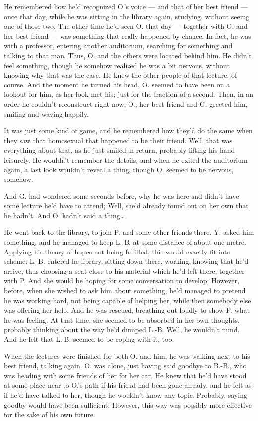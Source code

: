 He remembered how he'd recognized O.'s voice --- and that of her best friend --- once that day, while he was sitting in the library again, studying, without seeing one of those two. 
The other time he'd seen O. that day --- together with G. and her best friend --- was something that really happened by chance. In fact, he was with a professor, entering another auditorium, searching for something and talking to that man. Thus, O. and the others were located behind him. He didn't feel something, though he somehow realized he was a bit nervous, without knowing why that was the case. He knew the other people of that lecture, of course. And the moment he turned his head, O. seemed to have been on a lookout for him, as her look met his; just for the fraction of a second. Then, in an order he couldn't reconstruct right now, O., her best friend and G. greeted him, smiling and waving happily.

It was just some kind of game, and he remembered how they'd do the same when they saw that homosexual that happened to be their friend. 
Well, that was everything about that, as he just smiled in return, probably lifting his hand leisurely. He wouldn't remember the details, and when he exited the auditorium again, a last look wouldn't reveal a thing, though O. seemed to be nervous, somehow.

And G. had wondered some seconds before, why he was here and didn't have some lecture he'd have to attend; Well, she'd already found out on her own that he hadn't. 
And O. hadn't said a thing\dots{}

He went back to the library, to join P. and some other friends there. 
Y. asked him something, and he managed to keep L.-B. at some distance of about one metre. Applying his theory of hopes not being fulfilled, this would exactly fit into scheme: L.-B. entered he library, sitting down there, working, knowing that he'd arrive, thus choosing a seat close to his material which he'd left there, together with P. And she would be hoping for some conversation to develop; However, before, when she wished to ask him about something, he'd managed to pretend he was working hard, not being capable of helping her, while then somebody else was offering her help. And he was rescued, breathing out loudly to show P. what he was feeling. At that time, she seemed to be absorbed in her own thoughts, probably thinking about the way he'd dumped L.-B. Well, he wouldn't mind. And he felt that L.-B. seemed to be coping with it, too.

When the lectures were finished for both O. and him, he was walking next to his best friend, talking again. O. was alone, just having said goodbye to B.-B., who was heading with some friends of her for her car. He knew that he'd have stood at some place near to O.'s path if his friend had been gone already, and he felt as if he'd have talked to her, though he wouldn't know any topic. Probably, saying goodby would have been sufficient; However, this way was possibly more effective for the sake of his own future.


